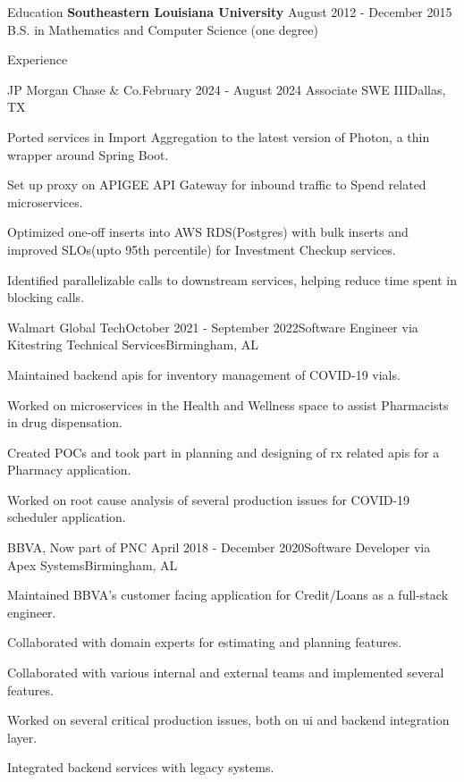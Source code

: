 \documentclass[11pt,]{resume}
\begin{document}
	\begin{rSection}{Education}
		\textbf{Southeastern Louisiana University} \hfill{August 2012 - December 2015} \\ B.S. in Mathematics and Computer Science (one degree)
	\end{rSection}

	\begin{rSection}{Experience}
		\begin{rSubsection}{JP Morgan Chase \& Co.}{February 2024 - August 2024} {Associate SWE III}{Dallas, TX}
			\item Ported services in Import Aggregation to the latest version of Photon, a thin wrapper around Spring Boot.
            \item Set up proxy on APIGEE API Gateway for inbound traffic to Spend related microservices.
            \item Optimized one-off inserts into AWS RDS(Postgres) with bulk inserts and improved SLOs(upto 95th percentile) for Investment Checkup services.
            \item Identified parallelizable calls to downstream services, helping reduce time spent in blocking calls.
		\end{rSubsection}

		\begin{rSubsection}{Walmart Global Tech}{October 2021 - September 2022}{Software Engineer via Kitestring Technical Services}{Birmingham, AL}
			\item Maintained backend apis for inventory management of COVID-19 vials.
			\item Worked on microservices in the Health and Wellness space to assist Pharmacists in drug dispensation.
			\item Created POCs and took part in planning and designing of rx related apis for a Pharmacy application.
			\item Worked on root cause analysis of several production issues for COVID-19 scheduler application.
		\end{rSubsection}

		\begin{rSubsection}{BBVA, Now part of PNC }{April 2018 - December 2020}{Software Developer via Apex Systems}{Birmingham, AL}
			\item Maintained BBVA's customer facing application for Credit/Loans as a full-stack engineer.
			\item Collaborated with domain experts for estimating and planning features.
			\item Collaborated with various internal and external teams and implemented several features.
			\item Worked on several critical production issues, both on ui and backend integration layer.
			\item Integrated backend services with legacy systems.
		\end{rSubsection}


\end{rSection}
\end{document}
